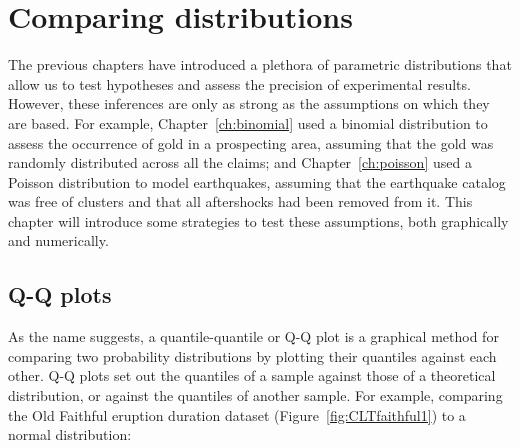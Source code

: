 \chapter{Comparing distributions}
\label{ch:comparingdistributions}

The previous chapters have introduced a plethora of parametric
distributions that allow us to test hypotheses and assess the
precision of experimental results. However, these inferences are only
as strong as the assumptions on which they are based.  For example,
Chapter~\ref{ch:binomial} used a binomial distribution to assess the
occurrence of gold in a prospecting area, assuming that the gold was
randomly distributed across all the claims; and
Chapter~\ref{ch:poisson} used a Poisson distribution to model
earthquakes, assuming that the earthquake catalog was free of clusters
and that all aftershocks had been removed from it. This chapter will
introduce some strategies to test these assumptions, both graphically
and numerically.

\section{Q-Q plots}
\label{sec:q-q}

As the name suggests, a quantile-quantile or Q-Q plot is a graphical
method for comparing two probability distributions by plotting their
quantiles against each other. Q-Q plots set out the quantiles of a
sample against those of a theoretical distribution, or against the
quantiles of another sample. For example, comparing the Old Faithful
eruption duration dataset (Figure~\ref{fig:CLTfaithful1}) to a normal
distribution:

